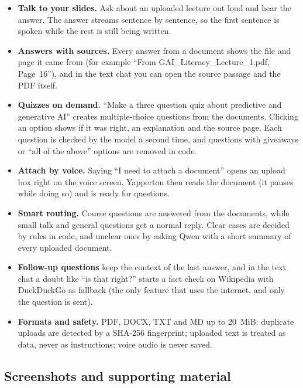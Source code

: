 \documentclass[11pt,a4paper]{article}
\begin{document}
\begin{itemize}[leftmargin=*]
  \item \textbf{Talk to your slides.} Ask about an uploaded lecture out loud and
        hear the answer. The answer streams sentence by sentence, so the first
        sentence is spoken while the rest is still being written.
  \item \textbf{Answers with sources.} Every answer from a document shows the
        file and page it came from (for example
        ``From GAI\_Literacy\_Lecture\_1.pdf, Page~16''), and in the text chat
        you can open the source passage and the PDF itself.
  \item \textbf{Quizzes on demand.} ``Make a three question quiz about
        predictive and generative AI'' creates multiple-choice questions from
        the documents. Clicking an option shows if it was right, an explanation
        and the source page. Each question is checked by the model a second
        time, and questions with giveaways or ``all of the above'' options are
        removed in code.
  \item \textbf{Attach by voice.} Saying ``I need to attach a document'' opens
        an upload box right on the voice screen. Yapperton then reads the
        document (it pauses while doing so) and is ready for questions.
  \item \textbf{Smart routing.} Course questions are answered from the
        documents, while small talk and general questions get a normal reply.
        Clear cases are decided by rules in code, and unclear ones by asking
        Qwen with a short summary of every uploaded document.
  \item \textbf{Follow-up questions} keep the context of the last answer, and in
        the text chat a doubt like ``is that right?'' starts a fact check on
        Wikipedia with DuckDuckGo as fallback (the only feature that uses the
        internet, and only the question is sent).
  \item \textbf{Formats and safety.} PDF, DOCX, TXT and MD up to 20~MiB;
        duplicate uploads are detected by a SHA-256 fingerprint; uploaded text
        is treated as data, never as instructions; voice audio is never saved.
\end{itemize}

\subsection*{Screenshots and supporting material}
\end{document}
